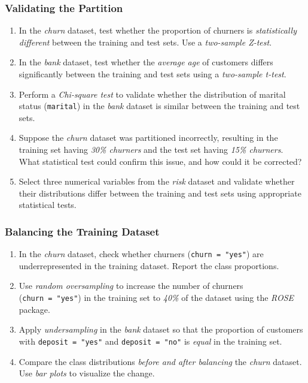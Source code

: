 \documentclass[
  11pt,
]{book}
\theoremstyle{definition}
\theoremstyle{definition}
\theoremstyle{definition}
\theoremstyle{definition}
\theoremstyle{remark}
\begin{document}
\subsubsection*{Validating the Partition}\label{validating-the-partition}


\begin{enumerate}
\def\labelenumi{\arabic{enumi}.}
\setcounter{enumi}{19}
\item
  In the \emph{churn} dataset, test whether the proportion of churners is \emph{statistically different} between the training and test sets. Use a \emph{two-sample Z-test}.
\item
  In the \emph{bank} dataset, test whether the \emph{average age} of customers differs significantly between the training and test sets using a \emph{two-sample t-test}.
\item
  Perform a \emph{Chi-square test} to validate whether the distribution of marital status (\texttt{marital}) in the \emph{bank} dataset is similar between the training and test sets.
\item
  Suppose the \emph{churn} dataset was partitioned incorrectly, resulting in the training set having \emph{30\% churners} and the test set having \emph{15\% churners}. What statistical test could confirm this issue, and how could it be corrected?
\item
  Select three numerical variables from the \emph{risk} dataset and validate whether their distributions differ between the training and test sets using appropriate statistical tests.
\end{enumerate}

\subsubsection*{Balancing the Training Dataset}\label{balancing-the-training-dataset-1}


\begin{enumerate}
\def\labelenumi{\arabic{enumi}.}
\setcounter{enumi}{24}
\item
  In the \emph{churn} dataset, check whether churners (\texttt{churn\ =\ "yes"}) are underrepresented in the training dataset. Report the class proportions.
\item
  Use \emph{random oversampling} to increase the number of churners (\texttt{churn\ =\ "yes"}) in the training set to \emph{40\%} of the dataset using the \emph{ROSE} package.
\item
  Apply \emph{undersampling} in the \emph{bank} dataset so that the proportion of customers with \texttt{deposit\ =\ "yes"} and \texttt{deposit\ =\ "no"} is \emph{equal} in the training set.
\item
  Compare the class distributions \emph{before and after balancing} the \emph{churn} dataset. Use \emph{bar plots} to visualize the change.
\end{enumerate}
\end{document}
